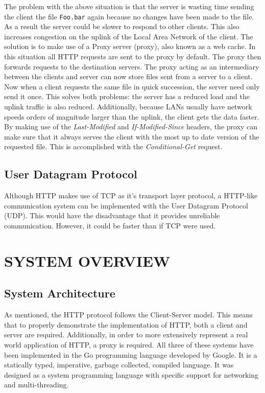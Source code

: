 \documentclass[10pt,twocolumn]{witseiepaper}
\begin{document}
	The problem with the above situation is that the server is wasting time sending the client the file \verb|Foo.bar| again because no changes have been made to the file. As a result the server could be slower to respond to other clients. This also increases congestion on the uplink of the Local Area Network of the client. The solution is to make use of a Proxy server (proxy), also known as a web cache. In this situation all HTTP requests are sent to the proxy by default. The proxy then forwards requests to the destination servers. The proxy acting as an intermediary between the clients and server can now store files sent from a server to a client. Now when a client requests the same file in quick succession, the server need only send it once. This solves both problems: the server has a reduced load and the uplink traffic is also reduced. Additionally, because LANs usually have network speeds orders of magnitude larger than the uplink, the client gets the data faster. By making use of the \emph{Last-Modified} and \emph{If-Modified-Since} headers, the proxy can make sure that it always serves the client with the most up to date version of the requested file. This is accomplished with the \emph{Conditional-Get} request. 	

	\subsection{User Datagram Protocol}

	Although HTTP makes use of TCP as it's transport layer protocol, a HTTP-like communication system can be implemented with the User Datagram Protocol (UDP). This would have the disadvantage that it provides unreliable communication. However, it could be faster than if TCP were used.


\section{SYSTEM OVERVIEW}

	\subsection{System Architecture}

	As mentioned, the HTTP protocol follows the Client-Server model. This means that to properly demonstrate the implementation of HTTP, both a client and server are required. Additionally, in order to more extensively represent a real world application of HTTP, a proxy is required. All three of these systems have been implemented in the Go programming language developed by Google. It is a statically typed, imperative, garbage collected, compiled language. It was designed as a system programming language with specific support for networking and multi-threading.
\end{document}
